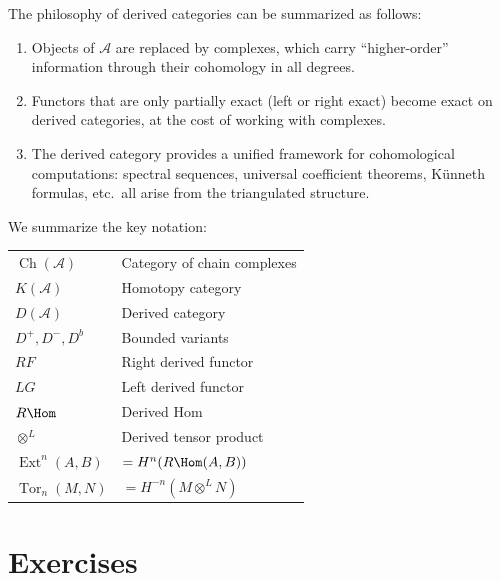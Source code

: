 \begin{remark}\label{rem:derived-cat-philosophy}
The philosophy of derived categories can be summarized as follows:
\begin{enumerate}
    \item Objects of $\mathcal{A}$ are replaced by complexes, which carry ``higher-order''
    information through their cohomology in all degrees.
    \item Functors that are only partially exact (left or right exact) become exact on derived
    categories, at the cost of working with complexes.
    \item The derived category provides a unified framework for cohomological computations:
    spectral sequences, universal coefficient theorems, K\"unneth formulas, etc.\
    all arise from the triangulated structure.
\end{enumerate}
\end{remark}

\begin{notation}\label{not:derived-summary}
We summarize the key notation:
\begin{center}
\renewcommand{\arraystretch}{1.3}
\begin{tabular}{ll}
\hline
$\operatorname{Ch}(\mathcal{A})$ & Category of chain complexes \\
$K(\mathcal{A})$ & Homotopy category \\
$D(\mathcal{A})$ & Derived category \\
$D^+, D^-, D^b$ & Bounded variants \\
$RF$ & Right derived functor \\
$LG$ & Left derived functor \\
$R\Hom$ & Derived Hom \\
$\otimes^L$ & Derived tensor product \\
$\operatorname{Ext}^n(A,B)$ & $= H^n(R\Hom(A,B))$ \\
$\operatorname{Tor}_n(M,N)$ & $= H^{-n}(M \otimes^L N)$ \\
\hline
\end{tabular}
\end{center}
\end{notation}


\section{Exercises}\label{sec:derived-exercises}

